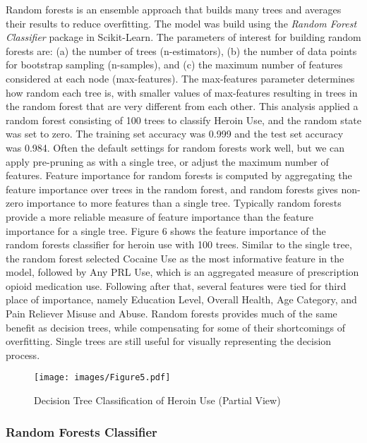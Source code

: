 \documentclass[sigconf]{acmart}
\begin{document}
Random forests is an ensemble approach that builds many trees and averages 
their results to reduce overfitting. The model was build using the 
\emph{Random Forest Classifier} package in Scikit-Learn. The parameters of 
interest for building random forests are: (a) the number of trees 
(n-estimators), (b) the number of data points for bootstrap sampling 
(n-samples), and (c) the maximum number of features considered at each node 
(max-features). The max-features parameter determines how random each tree is, 
with smaller values of max-features resulting in trees in the random forest 
that are very different from each other. This analysis applied a random forest 
consisting of 100 trees to classify Heroin Use, and the random state was set to 
zero. The training set accuracy was 0.999 and the test set accuracy was 0.984. 
Often the default settings for random forests work well, but we can apply
pre-pruning as with a single tree, or adjust the maximum number of features. 
Feature importance for random forests is computed by aggregating the feature 
importance over trees in the random forest, and random forests gives
non-zero importance to more features than a single tree. Typically random
forests provide a more reliable measure of feature importance than the
feature importance for a single tree. Figure 6 shows the feature importance 
of the random forests classifier for heroin use with 100 trees. Similar to
the single tree, the random forest selected Cocaine Use as the most
informative feature in the model, followed by Any PRL Use, which is an 
aggregated measure of prescription opioid medication use. Following after 
that, several features were tied for third place of importance, namely 
Education Level, Overall Health, Age Category, and Pain Reliever Misuse 
and Abuse. Random forests provides much of the same benefit as decision
trees, while compensating for some of their shortcomings of overfitting.
Single trees are still useful for visually representing the decision process.

\begin{figure}[!ht]
  \centering\texttt{[image: images/Figure5.pdf]}
  \caption{Decision Tree Classification of Heroin Use (Partial View)}
  \label{f:Figure5}
\end{figure}

\subsubsection{Random Forests Classifier}
\end{document}
